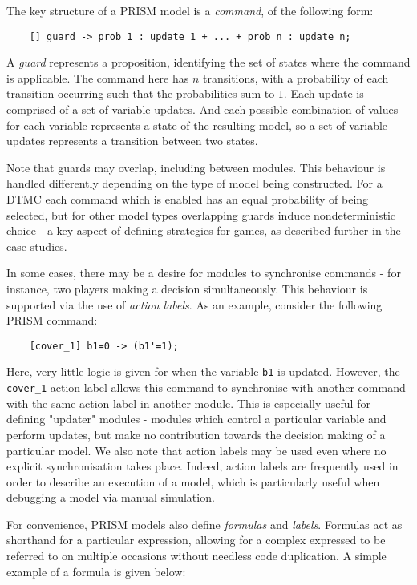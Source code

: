 The key structure of a PRISM model is a \emph{command}, of the following form:

\begin{verbatim}
    [] guard -> prob_1 : update_1 + ... + prob_n : update_n;
\end{verbatim}

A \emph{guard} represents a proposition, identifying the set of states where the command is applicable. The command here has $n$ transitions, with a probability of each transition occurring such that the probabilities sum to $1$. Each update is comprised of a set of variable updates. And each possible combination of values for each variable represents a state of the resulting model, so a set of variable updates represents a transition between two states.

Note that guards may overlap, including between modules. This behaviour is handled differently depending on the type of model being constructed. For a DTMC each command which is enabled has an equal probability of being selected, but for other model types overlapping guards induce nondeterministic choice - a key aspect of defining strategies for games, as described further in the case studies.

In some cases, there may be a desire for modules to synchronise commands - for instance, two players making a decision simultaneously. This behaviour is supported via the use of \emph{action labels}. As an example, consider the following PRISM command:

\begin{verbatim}
    [cover_1] b1=0 -> (b1'=1);
\end{verbatim}

Here, very little logic is given for when the variable \verb+b1+ is updated. However, the \verb+cover_1+ action label allows this command to synchronise with another command with the same action label in another module. This is especially useful for defining "updater" modules - modules which control a particular variable and perform updates, but make no contribution towards the decision making of a particular model. We also note that action labels may be used even where no explicit synchronisation takes place. Indeed, action labels are frequently used in order to describe an execution of a model, which is particularly useful when debugging a model via manual simulation.

For convenience, PRISM models also define \emph{formulas} and \emph{labels}. Formulas act as shorthand for a particular expression, allowing for a complex expressed to be referred to on multiple occasions without needless code duplication. A simple example of a formula is given below:

